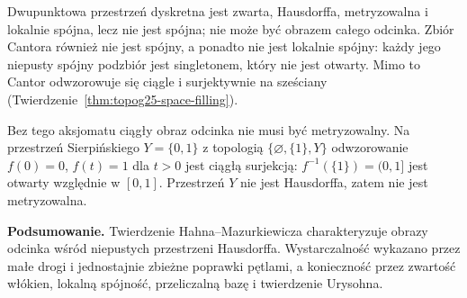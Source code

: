 \begin{przyklad}
\label{ex:topog26-cantor}
Dwupunktowa przestrzeń dyskretna
jest zwarta, Hausdorffa, metryzowalna
i lokalnie spójna, lecz nie jest spójna;
nie może być obrazem całego odcinka.
Zbiór Cantora również nie jest spójny,
a ponadto nie jest lokalnie spójny:
każdy jego niepusty spójny podzbiór
jest singletonem, który nie jest otwarty.
Mimo to Cantor odwzorowuje się
ciągle i surjektywnie na sześciany
(Twierdzenie~\ref{thm:topog25-space-filling}).
\end{przyklad}

\begin{uwaga}
\label{rem:topog26-metrizability}
Bez tego aksjomatu ciągły obraz odcinka
nie musi być metryzowalny.
Na przestrzeń Sierpińskiego
\(Y=\{0,1\}\) z topologią
\(\{\varnothing,\{1\},Y\}\)
odwzorowanie
\(f(0)=0\), \(f(t)=1\) dla \(t>0\)
jest ciągłą surjekcją:
\(f^{-1}(\{1\})=(0,1]\)
jest otwarty względnie w \([0,1]\).
Przestrzeń \(Y\) nie jest Hausdorffa,
zatem nie jest metryzowalna.
\end{uwaga}

\par\smallskip\noindent\textbf{Podsumowanie.}
Twierdzenie Hahna--Mazurkiewicza
charakteryzuje obrazy odcinka
wśród niepustych przestrzeni Hausdorffa.
Wystarczalność wykazano przez
małe drogi i jednostajnie zbieżne
poprawki pętlami, a konieczność
przez zwartość włókien,
lokalną spójność, przeliczalną bazę
i twierdzenie Urysohna.